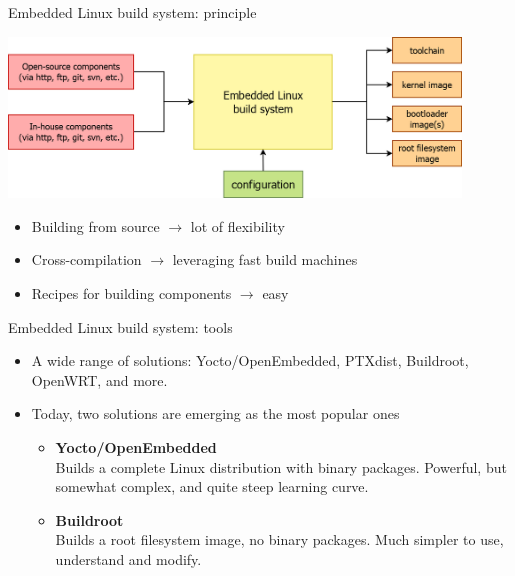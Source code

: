 \begin{frame}{Embedded Linux build system: principle}
  \begin{center}
    \includegraphics[width=0.9\textwidth]{slides/buildroot-yocto-introduction/buildsystem-principle.png}
  \end{center}
  \begin{itemize}
  \item Building from source $\rightarrow$ lot of flexibility
  \item Cross-compilation $\rightarrow$ leveraging fast build machines
  \item Recipes for building components $\rightarrow$ easy
  \end{itemize}
\end{frame}

\begin{frame}{Embedded Linux build system: tools}
  \begin{itemize}
  \item A wide range of solutions: Yocto/OpenEmbedded, PTXdist,
    Buildroot, OpenWRT, and more.
  \item Today, two solutions are emerging as the most popular ones
    \begin{itemize}
    \item {\bf Yocto/OpenEmbedded}\\Builds a complete Linux
      distribution with binary packages. Powerful, but somewhat
      complex, and quite steep learning curve.
    \item {\bf Buildroot}\\Builds a root filesystem image, no binary
      packages. Much simpler to use, understand and modify.
    \end{itemize}
  \end{itemize}
\end{frame}
